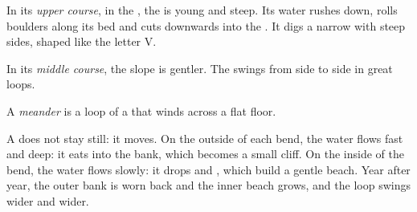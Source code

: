 In its \emph{upper course}, in the , the  is young and
steep. Its water rushes down, rolls boulders along its bed and cuts
downwards into the . It digs a narrow  with steep sides, shaped
like the letter V.

In its \emph{middle course}, the slope is gentler. The  swings from
side to side in great loops.

\begin{definition}[Meander]\label{def:g5:water-shapes-the-land:meander}
A \emph{meander} is a loop of a  that winds across a
flat  floor.
\end{definition}

A  does not stay still: it moves. On the outside of each bend, the
water flows fast and deep: it eats into the bank, which becomes a small
cliff. On the inside of the bend, the water flows slowly: it drops  and
, which build a gentle beach. Year after year, the outer bank is worn
back and the inner beach grows, and the loop swings wider and wider.

